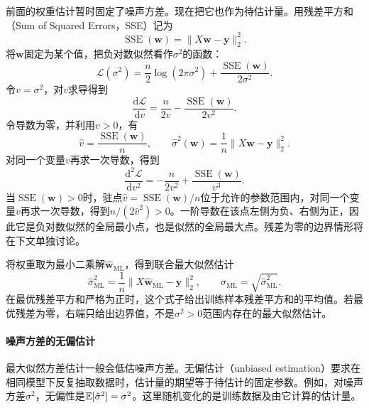 前面的权重估计暂时固定了噪声方差。现在把它也作为待估计量。用残差平方和（Sum of Squared Errors，SSE）记为
\begin{equation}
 \operatorname{SSE}(\bm w)=\|X\bm w-\bm y\|_2^2.
\end{equation}
将$\bm w$固定为某个值，把负对数似然看作$\sigma^2$的函数：
\begin{equation}
 \mathcal L(\sigma^2)
 =\frac n2\log(2\pi\sigma^2)
 +\frac{\operatorname{SSE}(\bm w)}{2\sigma^2}.
\end{equation}
令$v=\sigma^2$，对$v$求导得到
\begin{equation}
 \frac{\mathrm d\mathcal L}{\mathrm dv}
 =\frac{n}{2v}-\frac{\operatorname{SSE}(\bm w)}{2v^2}.
\end{equation}
令导数为零，并利用$v>0$，有
\begin{equation}
 \hat v=\frac{\operatorname{SSE}(\bm w)}{n},
 \qquad
 \hat\sigma^2(\bm w)=\frac1n\|X\bm w-\bm y\|_2^2.
\end{equation}
对同一个变量$v$再求一次导数，得到
\begin{equation}
 \frac{\mathrm d^2\mathcal L}{\mathrm dv^2}
 =-\frac{n}{2v^2}+\frac{\operatorname{SSE}(\bm w)}{v^3}.
\end{equation}
当$\operatorname{SSE}(\bm w)>0$时，驻点$\hat v=\operatorname{SSE}(\bm w)/n$位于允许的参数范围内，对同一个变量$v$再求一次导数，得到$n/(2\hat v^2)>0$。一阶导数在该点左侧为负、右侧为正，因此它是负对数似然的全局最小点，也是似然的全局最大点。残差为零的边界情形将在下文单独讨论。

将权重取为最小二乘解$\hat{\bm w}_{\mathrm{ML}}$，得到联合最大似然估计
\begin{equation}
 \boxed{\hat{\sigma}^2_{\mathrm{ML}}
 =\frac1n\|X\hat{\bm w}_{\mathrm{ML}}-\bm y\|_2^2},
 \qquad
 \hat\sigma_{\mathrm{ML}}=\sqrt{\hat\sigma^2_{\mathrm{ML}}}.
 \label{eq:linear-noise-variance-mle}
\end{equation}
在最优残差平方和严格为正时，这个式子给出训练样本残差平方和的平均值。若最优残差为零，右端只给出边界值，不是$\sigma^2>0$范围内存在的最大似然估计。

\paragraph{噪声方差的无偏估计}
最大似然方差估计一般会低估噪声方差。无偏估计（unbiased estimation）要求在相同模型下反复抽取数据时，估计量的期望等于待估计的固定参数。例如，对噪声方差$\sigma^2$，无偏性是$\mathbb{E}[\hat\sigma^2]=\sigma^2$。这里随机变化的是训练数据及由它计算的估计量。


